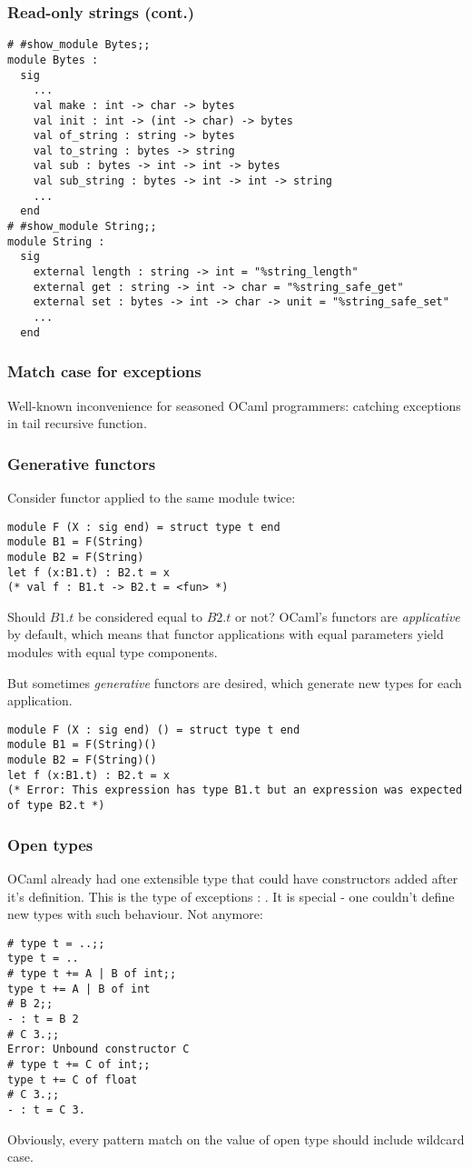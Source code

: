 \begin{frame}[fragile]
\frametitle{Read-only strings (cont.)}
\begin{lstlisting}
# #show_module Bytes;;
module Bytes :
  sig
    ...
    val make : int -> char -> bytes
    val init : int -> (int -> char) -> bytes
    val of_string : string -> bytes
    val to_string : bytes -> string
    val sub : bytes -> int -> int -> bytes
    val sub_string : bytes -> int -> int -> string
    ...
  end
# #show_module String;;
module String :
  sig
    external length : string -> int = "%string_length"
    external get : string -> int -> char = "%string_safe_get"
    external set : bytes -> int -> char -> unit = "%string_safe_set"
    ...
  end
\end{lstlisting}
\end{frame}

\begin{frame}
\frametitle{Match case for exceptions}
Well-known inconvenience for seasoned OCaml programmers: catching exceptions in tail recursive function.
\onslide<+->

\onslide<+->

\onslide<+->

\end{frame}

\begin{frame}[fragile]
\frametitle{Generative functors}
Consider functor applied to the same module twice:
\begin{lstlisting}
module F (X : sig end) = struct type t end
module B1 = F(String)
module B2 = F(String)
let f (x:B1.t) : B2.t = x
(* val f : B1.t -> B2.t = <fun> *)
\end{lstlisting}
Should $B1.t$ be considered equal to $B2.t$ or not?
OCaml's functors are \emph{applicative} by default, which means that functor applications with equal parameters
yield modules with equal type components.

But sometimes \emph{generative} functors are desired, which generate new types for each application.
\begin{lstlisting}
module F (X : sig end) () = struct type t end
module B1 = F(String)()
module B2 = F(String)()
let f (x:B1.t) : B2.t = x
(* Error: This expression has type B1.t but an expression was expected of type B2.t *)
\end{lstlisting}
\end{frame}

\begin{frame}[fragile]
\frametitle{Open types}
OCaml already had one extensible type that could have constructors added after it's definition. This is
the type of exceptions : . It is special - one couldn't define new types with such behaviour. Not anymore:
\begin{lstlisting}
# type t = ..;;
type t = ..
# type t += A | B of int;;
type t += A | B of int
# B 2;;
- : t = B 2
# C 3.;;
Error: Unbound constructor C
# type t += C of int;;
type t += C of float
# C 3.;;
- : t = C 3.
\end{lstlisting}
Obviously, every pattern match on the value of open type should include wildcard case.
\end{frame}

